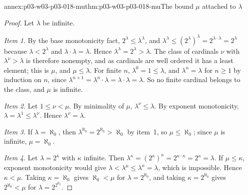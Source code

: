 \begin{annexitem}{annex:p03-w03-p03-018-mu}{thm:p03-w03-p03-018-mu}{The bound \(\mu\) attached to \(\lambda\)}
\begin{proof}
Let \(\lambda\) be infinite.

\emph{Item 1.}  By the base monotonicity fact,
\(2^\lambda\le\lambda^\lambda\), and
\(\lambda^\lambda\le(2^\lambda)^\lambda=2^{\lambda\cdot\lambda}=2^\lambda\)
because \(\lambda<2^\lambda\) and \(\lambda\cdot\lambda=\lambda\).  Hence
\(\lambda^\lambda=2^\lambda>\lambda\).  The class of cardinals \(\nu\) with
\(\lambda^\nu>\lambda\) is therefore nonempty, and as cardinals are well
ordered it has a least element; this is \(\mu\), and \(\mu\le\lambda\).  For
finite \(n\), \(\lambda^0=1\le\lambda\), and \(\lambda^n=\lambda\) for
\(n\ge1\) by induction on \(n\), since
\(\lambda^{n+1}=\lambda^n\cdot\lambda=\lambda\cdot\lambda=\lambda\).  So no
finite cardinal belongs to the class, and \(\mu\) is infinite.

\emph{Item 2.}  Let \(1\le\nu<\mu\).  By minimality of \(\mu\),
\(\lambda^\nu\le\lambda\).  By exponent monotonicity,
\(\lambda=\lambda^1\le\lambda^\nu\).  Hence \(\lambda^\nu=\lambda\).

\emph{Item 3.}  If \(\lambda=\aleph_0\), then
\(\lambda^{\aleph_0}=2^{\aleph_0}>\aleph_0\) by item~1, so
\(\mu\le\aleph_0\); since \(\mu\) is infinite, \(\mu=\aleph_0\).

\emph{Item 4.}  Let \(\lambda=2^\kappa\) with \(\kappa\) infinite.  Then
\(\lambda^\kappa=(2^\kappa)^\kappa=2^{\kappa\cdot\kappa}=2^\kappa=\lambda\).
If \(\mu\le\kappa\), exponent monotonicity would give
\(\lambda<\lambda^\mu\le\lambda^\kappa=\lambda\), which is impossible.  Hence
\(\kappa<\mu\).  Taking \(\kappa=\aleph_0\) gives \(\aleph_0<\mu\) for
\(\lambda=2^{\aleph_0}\), and taking \(\kappa=2^{\aleph_0}\) gives
\(2^{\aleph_0}<\mu\) for \(\lambda=2^{2^{\aleph_0}}\).
\end{proof}
\end{annexitem}

